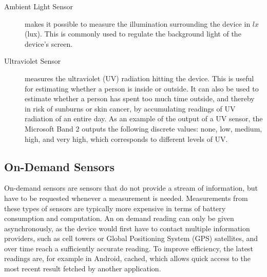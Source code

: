 \begin{description}
    \item[Ambient Light Sensor] makes it possible to measure the illumination surrounding the device in $lx$ (lux). This is commonly used to regulate the background light of the device's screen.
    \item[Ultraviolet Sensor] measures the ultraviolet (UV) radiation hitting the device. This is useful for estimating whether a person is inside or outside. It can also be used to estimate whether a person has spent too much time outside, and thereby in risk of sunburns or skin cancer, by accumulating readings of UV radiation of an entire day. As an example of the output of a UV sensor, the Microsoft Band 2 outputs the following discrete values: none, low, medium, high, and very high, which corresponds to different levels of UV. 
\end{description}

\subsection{On-Demand Sensors}
On-demand sensors are sensors that do not provide a stream of information, but have to be requested whenever a measurement is needed. Measurements from these types of sensors are typically more expensive in terms of battery consumption and computation. An on demand reading can only be given asynchronously, as the device would first have to contact multiple information providers, such as cell towers or Global Positioning System (GPS) satellites, and over time reach a sufficiently accurate reading. To improve efficiency, the latest readings are, for example in Android, cached, which allows quick access to the most recent result fetched by another application.

